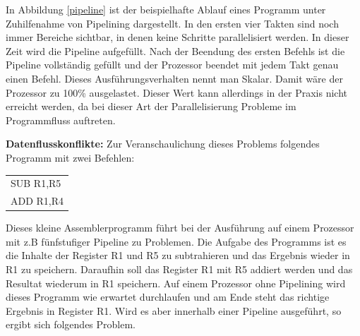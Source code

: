 \documentclass[12pt]{article}
\begin{document}
\noindent In Abbildung \ref{pipeline} ist der beispielhafte Ablauf eines Programm unter Zuhilfenahme von Pipelining dargestellt. In den ersten vier Takten sind noch immer Bereiche sichtbar, in denen keine Schritte parallelisiert werden. In dieser Zeit wird die Pipeline aufgefüllt. Nach der Beendung des ersten Befehls ist die Pipeline vollständig gefüllt und der Prozessor beendet mit jedem Takt genau einen Befehl. Dieses Ausführungsverhalten nennt man Skalar. Damit wäre der Prozessor zu 100\% ausgelastet. Dieser Wert kann allerdings in der Praxis nicht erreicht werden, da bei dieser Art der Parallelisierung Probleme im Programmfluss auftreten.

\par\bigskip\noindent\textbf{Datenflusskonflikte:} Zur Veranschaulichung dieses Problems folgendes Programm mit zwei Befehlen:

\begin{table}[!htb]
\centering
\label{confliktProgramm}
\begin{tabular}{l}
SUB R1,R5 \\
ADD R1,R4
\end{tabular}
\end{table}

\noindent Dieses kleine Assemblerprogramm führt bei der Ausführung auf einem Prozessor mit z.B fünfstufiger Pipeline zu Problemen. Die Aufgabe des Programms ist es die Inhalte der Register R1 und R5 zu subtrahieren und das Ergebnis wieder in R1 zu speichern. Daraufhin soll das Register R1 mit R5 addiert werden und das Resultat wiederum in R1 speichern. Auf einem Prozessor ohne Pipelining wird dieses Programm wie erwartet durchlaufen und am Ende steht das richtige Ergebnis in Register R1. Wird es aber innerhalb einer Pipeline ausgeführt, so ergibt sich folgendes Problem.
\end{document}
